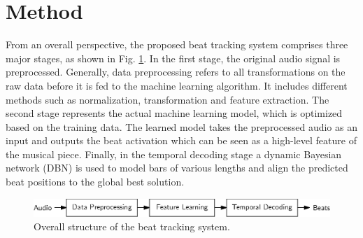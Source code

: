 \documentclass{scrartcl}
\begin{document}
\newpage


\section{Method}
\label{sec:method}

From an overall perspective, the proposed beat tracking system comprises three major stages, as shown in Fig. \ref{fig:system}. In the first stage, the original audio signal is preprocessed. Generally, data preprocessing refers to all transformations on the raw data before it is fed to the machine learning algorithm. It includes different methods such as normalization, transformation and feature extraction. The second stage represents the actual machine learning model, which is optimized based on the  training data. The learned model takes the preprocessed audio as an input and outputs the beat activation which can be seen as a high-level feature of the musical piece. Finally, in the temporal decoding stage a dynamic Bayesian network (DBN) is used to model bars of various lengths and align the predicted beat positions to the global best solution.  
\begin{figure}[htbp]
\centering
\includegraphics[scale=1.0,trim={0 0 0 -0.5em}]{figures/beat_tracking_system.eps}
\caption{Overall structure of the beat tracking system.}
\label{fig:system}
\end{figure}  
\end{document}
